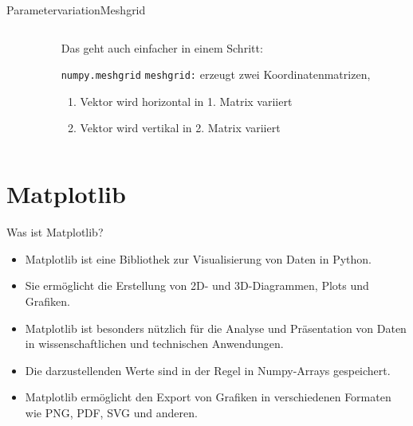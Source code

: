 \documentclass[xelatex,aspectratio=169]{beamer}
\begin{document}
\begin{frame}{Parametervariation}{Meshgrid}
    \begin{columns}
        \begin{column}{0.6\textwidth}
            \inputminted[firstline=3]{python}{src/numpy_meshgrid.py}
        \end{column}
        \begin{column}{0.4\textwidth}
            Das geht auch einfacher in einem Schritt:
            \begin{block}{\texttt{numpy.meshgrid}}
                \texttt{meshgrid:} erzeugt zwei Koordinatenmatrizen,
                \begin{enumerate}
                    \item Vektor wird horizontal in 1. Matrix variiert
                    \item Vektor wird vertikal in 2. Matrix variiert
                \end{enumerate}
            \end{block}
        \end{column}
    \end{columns}

\end{frame}

\section{Matplotlib}

\begin{frame}{Was ist Matplotlib?}
    \begin{itemize}
        \item Matplotlib ist eine Bibliothek zur Visualisierung von Daten in Python.
        \item Sie ermöglicht die Erstellung von 2D- und 3D-Diagrammen, Plots und Grafiken.
        \item Matplotlib ist besonders nützlich für die Analyse und Präsentation von Daten in wissenschaftlichen und technischen Anwendungen.
        \item Die darzustellenden Werte sind in der Regel in Numpy-Arrays gespeichert.
        \item Matplotlib ermöglicht den Export von Grafiken in verschiedenen Formaten wie PNG, PDF, SVG und anderen.
    \end{itemize}
\end{frame}
\end{document}
